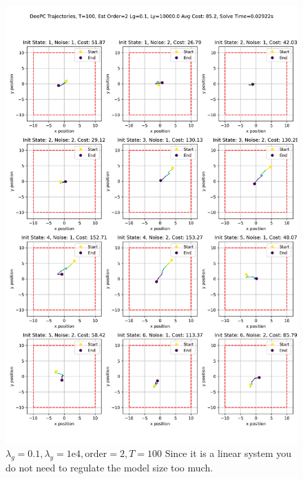 \documentclass[11pt,a4paper]{article}
\begin{document}
\begin{figure}
    \centering
    \includegraphics[width=0.85\linewidth]{./figures/DeePC_trajectories_100_2_0.1_10000.0.png}
    \caption{$\lambda_g=0.1, \lambda_y=1\mathrm{e}4, \text{order}=2, T=100$ Since it is a linear system you do not need to regulate the model size too much.}
    \label{fig:enter-label}
\end{figure}
\end{document}
